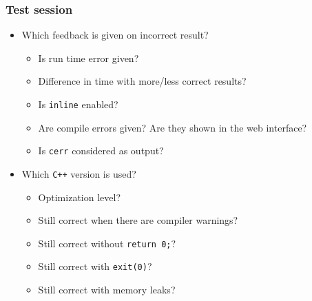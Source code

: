 \subsubsection{Test session}
\begin{itemize}
    \item Which feedback is given on incorrect result?
    \begin{itemize}
        \item Is run time error given?
        \item Difference in time with more/less correct results?
        \item Is \texttt{inline} enabled?
        \item Are compile errors given? Are they shown in the web interface?
        \item Is \texttt{cerr} considered as output?
    \end{itemize}
    \item Which \texttt{C++} version is used?
    \begin{itemize}
        \item Optimization level?
        \item Still correct when there are compiler warnings?
        \item Still correct without \texttt{return 0;}?
        \item Still correct with \texttt{exit(0)}?
        \item Still correct with memory leaks?
    \end{itemize}
\end{itemize}

